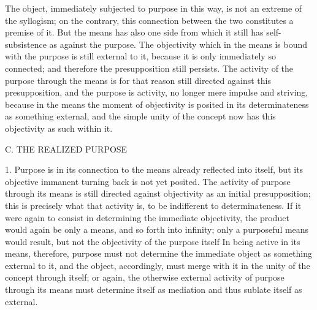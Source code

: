 The object, immediately subjected to purpose in this way,
is not an extreme of the syllogism;
on the contrary, this connection between the two
constitutes a premise of it.
But the means has also one side from which
it still has self-subsistence as against the purpose.
The objectivity which in the means is bound
with the purpose is still external to it,
because it is only immediately so connected;
and therefore the presupposition still persists.
The activity of the purpose through the means is
for that reason still directed against this presupposition,
and the purpose is activity,
no longer mere impulse and striving,
because in the means the moment of objectivity is
posited in its determinateness as something external,
and the simple unity of the concept now has
this objectivity as such within it.

C. THE REALIZED PURPOSE

1. Purpose is in its connection to the means
already reflected into itself,
but its objective immanent turning back is not yet posited.
The activity of purpose through its means is
still directed against objectivity as
an initial presupposition;
this is precisely what that activity is,
to be indifferent to determinateness.
If it were again to consist in
determining the immediate objectivity,
the product would again be only a means,
and so forth into infinity;
only a purposeful means would result,
but not the objectivity of the purpose itself
In being active in its means, therefore,
purpose must not determine the immediate object as
something external to it,
and the object, accordingly, must merge with it
in the unity of the concept through itself;
or again, the otherwise external activity of purpose
through its means must determine itself as mediation
and thus sublate itself as external.

